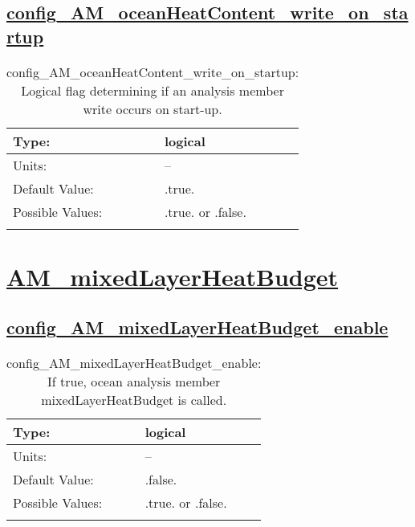 \subsection[config\_AM\_oceanHeatContent\_write\_on\_startup]{\hyperref[sec:nm_tab_AM_oceanHeatContent]{config\_AM\_oceanHeatContent\_write\_on\_startup}}
\label{subsec:nm_sec_config_AM_oceanHeatContent_write_on_startup}
\begin{center}
\begin{longtable}{| p{2.0in} || p{4.0in} |}
    \hline
    Type: & logical \\
    \hline
    Units: & -- \\
    \hline
    Default Value: & .true. \\
    \hline
    Possible Values: & .true. or .false. \\
    \hline
    \caption{config\_AM\_oceanHeatContent\_write\_on\_startup: Logical flag determining if an analysis member write occurs on start-up.}
\end{longtable}
\end{center}
\section[AM\_mixedLayerHeatBudget]{\hyperref[sec:nm_tab_AM_mixedLayerHeatBudget]{AM\_mixedLayerHeatBudget}}
\label{sec:nm_sec_AM_mixedLayerHeatBudget}
\subsection[config\_AM\_mixedLayerHeatBudget\_enable]{\hyperref[sec:nm_tab_AM_mixedLayerHeatBudget]{config\_AM\_mixedLayerHeatBudget\_enable}}
\label{subsec:nm_sec_config_AM_mixedLayerHeatBudget_enable}
\begin{center}
\begin{longtable}{| p{2.0in} || p{4.0in} |}
    \hline
    Type: & logical \\
    \hline
    Units: & -- \\
    \hline
    Default Value: & .false. \\
    \hline
    Possible Values: & .true. or .false. \\
    \hline
    \caption{config\_AM\_mixedLayerHeatBudget\_enable: If true, ocean analysis member mixedLayerHeatBudget is called.}
\end{longtable}
\end{center}
